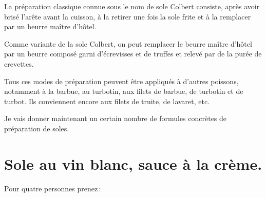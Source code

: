 \sk

La préparation classique connue sous le nom de sole Colbert consiste, après
avoir brisé l'arête avant la cuisson, à la retirer une fois la sole frite et
à la remplacer par un beurre maître d'hôtel.

\sk

Comme variante de la sole Colbert, on peut remplacer le beurre maître d'hôtel
par un beurre composé garni d'écrevisses et de truffes et relevé par de la
purée de crevettes.

\sk

Tous ces modes de préparation peuvent être appliqués à d'autres poissons,
notamment à la barbue, au turbotin, aux filets de barbue, de turbotin et de
turbot. Ils conviennent encore aux filets de truite, de lavaret, etc.

\sk

Je vais donner maintenant un certain nombre de formules concrètes de
préparation de soles.

\section*{\centering Sole au vin blanc, sauce à la crème.}

Pour quatre personnes prenez :

\medskip

